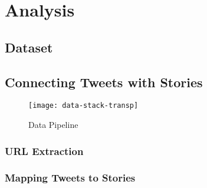  \chapter{Analysis}
 \section{Dataset}





\section{Connecting Tweets with Stories}

\begin{figure}[H]  
\centering 
  \texttt{[image: data-stack-transp]}  
  \caption{Data Pipeline
    \label{fig:data-stack}}
\end{figure}
 


 \subsection{URL Extraction}
 \subsection{Mapping Tweets to Stories}
 


